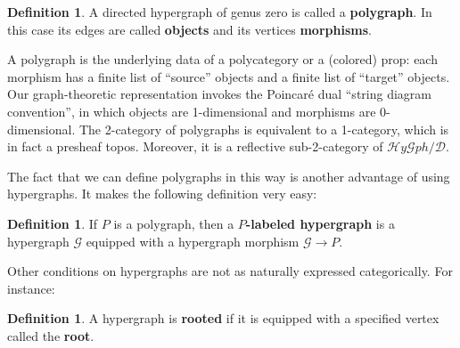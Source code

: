 \documentclass{article}
\theoremstyle{definition}
\newtheorem{defn}[thm]{Definition}
\theoremstyle{remark}
\def\G{\mathcal{G}}
\def\hy{\mathcal{H}\mathit{y}\mathcal{G}\mathit{ph}}
\def\dhy{\mathcal{D}}
\begin{document}
\begin{defn}
  A directed hypergraph of genus zero is called a \textbf{polygraph}.
  In this case its edges are called \textbf{objects} and its vertices \textbf{morphisms}.
\end{defn}

A polygraph is the underlying data of a polycategory or a (colored) prop: each morphism has a finite list of ``source'' objects and a finite list of ``target'' objects.
Our graph-theoretic representation invokes the Poincar\'e dual ``string diagram convention'', in which objects are 1-dimensional and morphisms are 0-dimensional.
The 2-category of polygraphs is equivalent to a 1-category, which is in fact a presheaf topos.
Moreover, it is a reflective sub-2-category of $\hy/\dhy$.

The fact that we can define polygraphs in this way is another advantage of using hypergraphs.
It makes the following definition very easy:

\begin{defn}\label{thm:labeled}
  If $P$ is a polygraph, then a \textbf{$P$-labeled hypergraph} is a hypergraph $\G$ equipped with a hypergraph morphism $\G\to P$.
\end{defn}

Other conditions on hypergraphs are not as naturally expressed categorically.
For instance:

\begin{defn}
  A hypergraph is \textbf{rooted} if it is equipped with a specified vertex called the \textbf{root}.
\end{defn}
\end{document}

